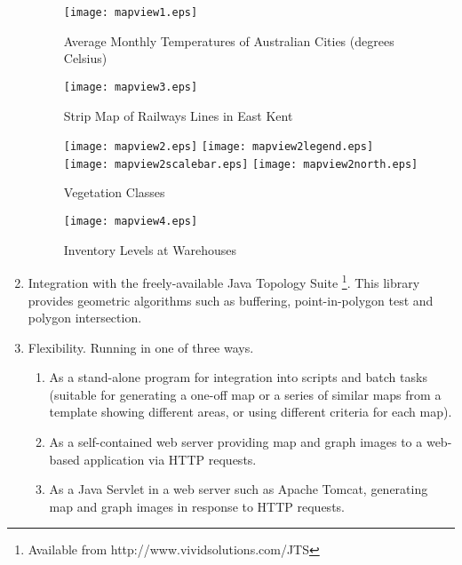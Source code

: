 \begin{enumerate}
\begin{figure}
\texttt{[image: mapview1.eps]}
\caption[Average Monthly Temperatures]{Average Monthly Temperatures of Australian Cities (degrees Celsius)}
\label{mapview1}
\end{figure}

\begin{figure}
\texttt{[image: mapview3.eps]}
\caption{Strip Map of Railways Lines in East Kent}
\label{mapview3}
\end{figure}

\begin{figure}

\texttt{[image: mapview2.eps]}
\texttt{[image: mapview2legend.eps]}
\vspace{1pt}
\texttt{[image: mapview2scalebar.eps]}
\texttt{[image: mapview2north.eps]}
\caption{Vegetation Classes}
\label{mapview2}
\end{figure}

\begin{figure}
\texttt{[image: mapview4.eps]}
\caption{Inventory Levels at Warehouses}
\label{mapview4}
\end{figure}


\item
Integration with the freely-available
Java Topology Suite
\footnote{Available from http://www.vividsolutions.com/JTS}.
This library provides geometric algorithms
such as buffering, point-in-polygon test and polygon intersection.

\item
Flexibility.  Running in one of three ways.

\begin{enumerate}
\item
As a stand-alone program for integration into
scripts and batch tasks (suitable for generating a one-off
map or a series of similar maps from a template
showing different areas, or using different criteria for each map).

\item
As a self-contained web server providing map and
graph images to a web-based application via HTTP requests.

\item
As a Java Servlet in a web server such as Apache Tomcat,
generating map and graph images in response to HTTP requests.

\end{enumerate}

\end{enumerate}

